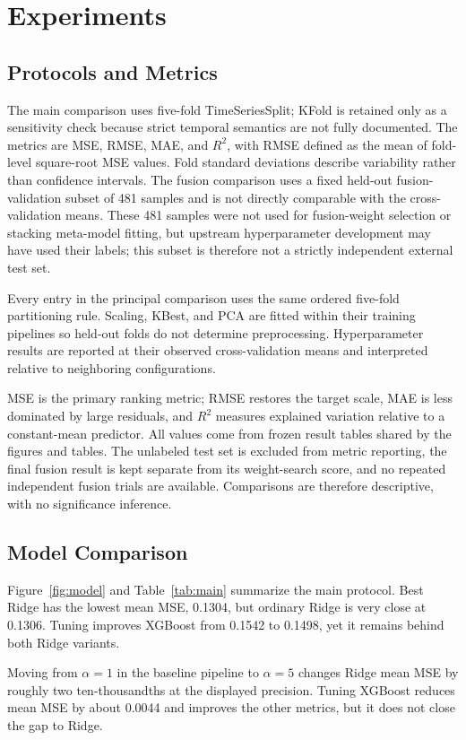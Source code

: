 \documentclass[sigconf,screen,review,anonymous]{acmart}
\begin{document}
\section{Experiments}
\subsection{Protocols and Metrics}
The main comparison uses five-fold TimeSeriesSplit; KFold is retained only as a sensitivity check because strict temporal semantics are not fully documented. The metrics are MSE, RMSE, MAE, and $R^2$, with RMSE defined as the mean of fold-level square-root MSE values. Fold standard deviations describe variability rather than confidence intervals. The fusion comparison uses a fixed held-out fusion-validation subset of 481 samples and is not directly comparable with the cross-validation means. These 481 samples were not used for fusion-weight selection or stacking meta-model fitting, but upstream hyperparameter development may have used their labels; this subset is therefore not a strictly independent external test set.

Every entry in the principal comparison uses the same ordered five-fold partitioning rule. Scaling, KBest, and PCA are fitted within their training pipelines so held-out folds do not determine preprocessing. Hyperparameter results are reported at their observed cross-validation means and interpreted relative to neighboring configurations.

MSE is the primary ranking metric; RMSE restores the target scale, MAE is less dominated by large residuals, and $R^2$ measures explained variation relative to a constant-mean predictor. All values come from frozen result tables shared by the figures and tables. The unlabeled test set is excluded from metric reporting, the final fusion result is kept separate from its weight-search score, and no repeated independent fusion trials are available. Comparisons are therefore descriptive, with no significance inference.

\subsection{Model Comparison}
Figure~\ref{fig:model} and Table~\ref{tab:main} summarize the main protocol. Best Ridge has the lowest mean MSE, 0.1304, but ordinary Ridge is very close at 0.1306. Tuning improves XGBoost from 0.1542 to 0.1498, yet it remains behind both Ridge variants.

Moving from $\alpha=1$ in the baseline pipeline to $\alpha=5$ changes Ridge mean MSE by roughly two ten-thousandths at the displayed precision. Tuning XGBoost reduces mean MSE by about 0.0044 and improves the other metrics, but it does not close the gap to Ridge.
\end{document}
